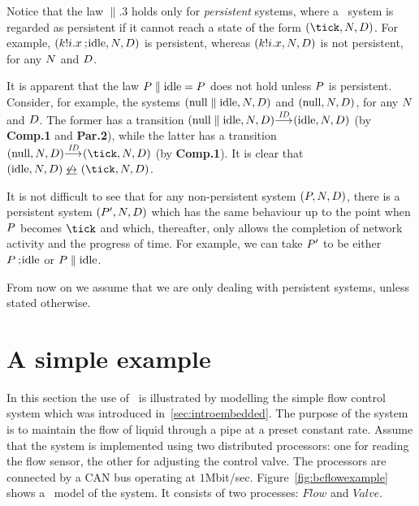 Notice that the law $\parallel.3$ holds only for \emph{persistent}
systems, where a \bcandle\ system is regarded as persistent if it
cannot reach a state of the form $(\tick,\N,\D)$. For example,
$(\kk!\ii.\xx \sq \idle,\N,\D)$ is persistent, whereas
$(\kk!\ii.\xx,\N,\D)$ is not persistent, for any $\N$ and $\D$.


It is apparent that the law $\P \parallel \idle = \P$ does not
hold unless $\P$ is persistent. Consider, for example, the systems
$(\donothing \parallel \idle,\N,\D)$ and $(\donothing,\N,\D)$, for any
$\N$ and $\D$.  The former has a transition $(\donothing \parallel
\idle,\N,\D) \goes{\ID} (\idle,\N,\D)$ (by \textbf{Comp.1} and 
\textbf{Par.2}), while the latter has a transition $(\donothing,\N,\D) 
\goes{\ID} (\tick,\N,\D)$ (by \textbf{Comp.1}). 
It is clear that $(\idle,\N,\D) \not\bisim (\tick,\N,\D)$.

It is not difficult to see that for any non-persistent system $(\P,\N,\D)$,
there is a persistent system $(\P',\N,\D)$ which has the same behaviour
up to the point when $\P$ becomes $\tick$ and which, thereafter, only allows
the completion of network activity and the progress of time. For example,
we can take $\P'$ to be either $\P \sq \idle$ or $\P \parallel \idle$.

From now on we assume that we are only dealing with persistent systems,
unless stated otherwise. 

\section{A simple example}\label{sec:bcexample}
In this section the use of \bcandle\ is illustrated by modelling the
simple flow control system which was introduced
in~\Sec\ref{sec:introembedded}. The purpose of the system is to
maintain the flow of liquid through a pipe at a preset constant rate.
Assume that the system is implemented using two distributed processors: one
for reading the flow sensor, the other for adjusting the control
valve. The processors are connected by a CAN bus operating at
$1$Mbit/sec.  Figure~\ref{fig:bcflowexample} shows a \bcandle\ model
of the system. It consists of two processes: $Flow$ and
$Valve$. 

